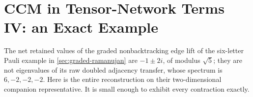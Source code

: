 
\section{CCM in Tensor-Network Terms IV: an Exact Example}
\label{sec:ccm-tn-examples}

The net retained values of the graded nonbacktracking edge lift of
the six-letter Pauli example in \cref{sec:graded-ramanujan} are
$-1\pm2i$, of modulus $\sqrt5$; they are not eigenvalues of its
raw doubled adjacency transfer, whose spectrum is $6,-2,-2,-2$.
Here is the entire reconstruction on their two-dimensional companion
representative. It is small enough to exhibit every contraction exactly.

